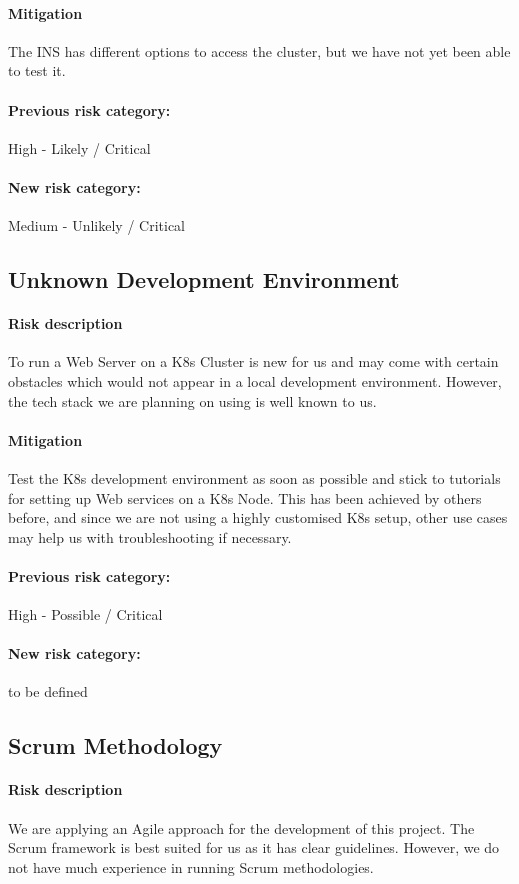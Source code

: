 \paragraph{Mitigation} The INS has different options to access the cluster, but we have not yet been able to test it.
\paragraph{Previous risk category:} High - Likely / Critical
\paragraph{New risk category:} Medium - Unlikely / Critical

\subsection{Unknown Development Environment}
\paragraph{Risk description} To run a Web Server on a K8s Cluster is new for us and may come with certain obstacles which would not appear in a local development environment. However, the tech stack we are planning on using is well known to us.
\paragraph{Mitigation} Test the K8s development environment as soon as possible and stick to tutorials for setting up Web services on a K8s Node. This has been achieved by others before, and since we are not using a highly customised K8s setup, other use cases may help us with troubleshooting if necessary.
\paragraph{Previous risk category:} High - Possible / Critical
\paragraph{New risk category:} to be defined

\subsection{Scrum Methodology}
\paragraph{Risk description} We are applying an Agile approach for the development of this project. The Scrum framework is best suited for us as it has clear guidelines. However, we do not have much experience in running Scrum methodologies. 

